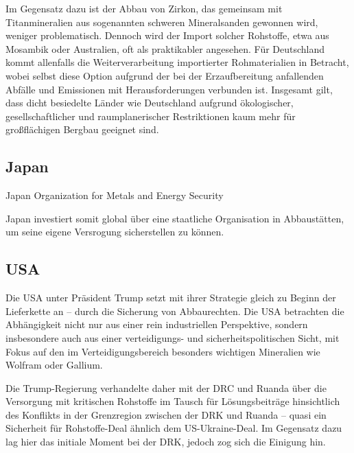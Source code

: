 \documentclass[12pt,a4paper,oneside]{book} %
\begin{document}
Im Gegensatz dazu ist der Abbau von Zirkon, das gemeinsam mit Titanmineralien aus sogenannten schweren Mineralsanden gewonnen wird, weniger problematisch. Dennoch wird der Import solcher Rohstoffe, etwa aus Mosambik oder Australien, oft als praktikabler angesehen. Für Deutschland kommt allenfalls die Weiterverarbeitung importierter Rohmaterialien in Betracht, wobei selbst diese Option aufgrund der bei der Erzaufbereitung anfallenden Abfälle und Emissionen mit Herausforderungen verbunden ist. Insgesamt gilt, dass dicht besiedelte Länder wie Deutschland aufgrund ökologischer, gesellschaftlicher und raumplanerischer Restriktionen kaum mehr für großflächigen Bergbau geeignet sind.



\subsection{Japan}

Japan Organization for Metals and Energy Security

Japan investiert somit global über eine staatliche Organisation in Abbaustätten, um seine eigene Versrogung sicherstellen zu können.


\subsection{USA}
Die USA unter Präsident Trump setzt mit ihrer Strategie gleich zu Beginn der Lieferkette an -- durch die Sicherung von Abbaurechten. Die USA betrachten die Abhängigkeit nicht nur aus einer rein industriellen Perspektive, sondern insbesondere auch aus einer verteidigungs- und sicherheitspolitischen Sicht, mit Fokus auf den im Verteidigungsbereich besonders wichtigen Mineralien wie Wolfram oder Gallium.

Die Trump-Regierung verhandelte daher mit der DRC und Ruanda über die Versorgung mit kritischen Rohstoffe im Tausch für Lösungsbeiträge hinsichtlich des Konflikts in der Grenzregion zwischen der DRK und Ruanda -- quasi ein \glqq Sicherheit für Rohstoffe\grqq-Deal ähnlich dem US-Ukraine-Deal. Im Gegensatz dazu lag hier das initiale Moment bei der DRK, jedoch zog sich die Einigung hin.
\end{document}
